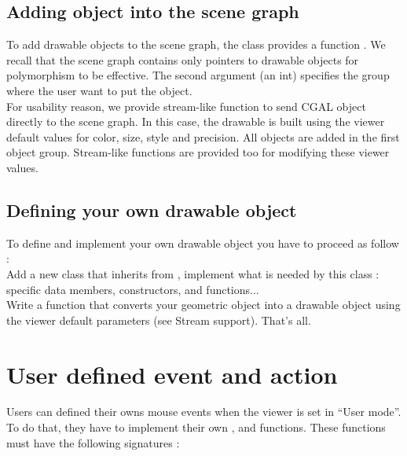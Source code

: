 \subsection{Adding object into the scene graph}

To add drawable objects to the scene graph, the  class 
provides a function . We recall that the scene graph contains only pointers to
drawable objects for polymorphism to be effective. The second
argument (an int) specifies the group where the user want to put the
object. \\
For usability reason, we provide stream-like function to send 
CGAL object directly to the scene graph. In this case, the drawable is built
using the viewer default values for color, size, style and
precision. All objects are added in the first object group. Stream-like functions are provided too for modifying these
viewer values.

\subsection{Defining your own drawable object}

To define and implement your own drawable object you have to proceed
as follow : \\
Add a new class that inherits from , implement
what is needed by this class : specific data members, constructors,
 and  functions...\\
Write a  function that converts your geometric object into
a drawable object using the viewer default parameters (see Stream support). That's all.

\section{User defined event and action}

Users can defined their owns mouse events when the viewer is set in
``User mode''. To do that, they have to implement their own ,
 and  functions. These functions must have
the following signatures :

\\
\\


